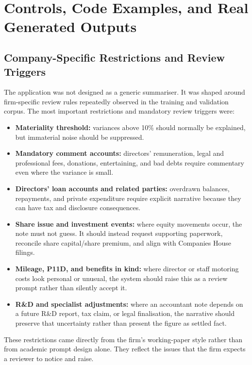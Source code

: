 \chapter{Controls, Code Examples, and Real Generated Outputs}
\label{app:controls_examples}

\section{Company-Specific Restrictions and Review Triggers}
\label{app:sec:company_restrictions}

The application was not designed as a generic summariser. It was shaped around firm-specific review rules repeatedly observed in the training and validation corpus. The most important restrictions and mandatory review triggers were:
\begin{itemize}
    \item \textbf{Materiality threshold:} variances above 10\% should normally be explained, but immaterial noise should be suppressed.
    \item \textbf{Mandatory comment accounts:} directors' remuneration, legal and professional fees, donations, entertaining, and bad debts require commentary even where the variance is small.
    \item \textbf{Directors' loan accounts and related parties:} overdrawn balances, repayments, and private expenditure require explicit narrative because they can have tax and disclosure consequences.
    \item \textbf{Share issue and investment events:} where equity movements occur, the note must not guess. It should instead request supporting paperwork, reconcile share capital/share premium, and align with Companies House filings.
    \item \textbf{Mileage, P11D, and benefits in kind:} where director or staff motoring costs look personal or unusual, the system should raise this as a review prompt rather than silently accept it.
    \item \textbf{R\&D and specialist adjustments:} where an accountant note depends on a future R\&D report, tax claim, or legal finalisation, the narrative should preserve that uncertainty rather than present the figure as settled fact.
\end{itemize}

These restrictions came directly from the firm's working-paper style rather than from academic prompt design alone. They reflect the issues that the firm expects a reviewer to notice and raise.

